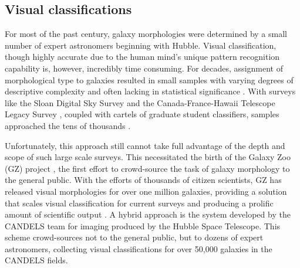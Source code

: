 \subsection{Visual classifications}
For most of the past century, galaxy morphologies were determined by a small number of expert astronomers beginning with Hubble. Visual classification, though highly accurate due to the human mind's unique pattern recognition capability is, however, incredibly time consuming. For decades, assignment of morphological type to galaxies resulted in small samples with varying degrees of descriptive complexity and often lacking in statistical significance \citep{Hubble1936, Sandage1961, SandageTammann1981, deVaucouleurs1963, deVaucouleurs1991}. With surveys like the Sloan Digital Sky Survey \citep[SDSS,][]{Abazajian2003} and the Canada-France-Hawaii Telescope Legacy Survey \citep{Gwyn2012}, coupled with cartels of graduate student classifiers, samples approached the tens of thousands \citep{Fukugita2007, Schawinski2007, NairAbraham2010}.

Unfortunately, this approach still cannot take full advantage of the depth and scope of such large scale surveys. This necessitated the birth of the Galaxy Zoo (GZ) project \citep{Lintott2008, Lintott2011, Willett2013, Willett2017, Simmons2017}, the first effort to crowd-source the task of galaxy morphology to the general public. With the efforts of thousands of citizen scientists, GZ has released visual morphologies for over one million galaxies, providing a solution that scales visual classification for current surveys and producing a prolific amount of scientific output \citep[e.g.,][]{Land2008, Bamford2009, Darg2010, Schawinski2014, Galloway2015, Smethurst2016}.
A hybrid approach is the system developed by the CANDELS \citep{Grogin2011, Koekemoer2011} team for imaging produced by the Hubble Space Telescope. This scheme \citep{Kartaltepe2015} crowd-sources not to the general public, but to dozens of expert astronomers, collecting visual classifications for over 50,000 galaxies in the CANDELS fields. 


